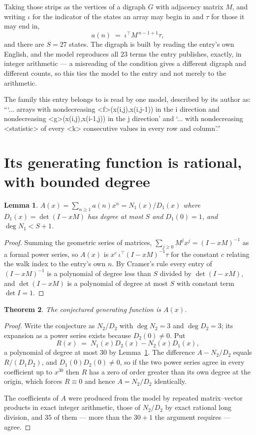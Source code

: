 \documentclass[11pt,a4paper]{article}
\theoremstyle{plain}
\newtheorem{theorem}{Theorem}
\newtheorem{lemma}[theorem]{Lemma}
\theoremstyle{definition}
\begin{document}
Taking those strips as the vertices of a digraph $G$ with adjacency matrix $M$, and writing
$\iota$ for the indicator of the states an array may begin in and $\tau$ for those it may end
in,
\[
a(n)\;=\;\iota^{\!\top}M^{\,n-1+1}\tau ,
\]
and there are $S=27$ states. The digraph is built by reading the entry's own English, and the
model reproduces all $23$ terms the entry publishes, exactly, in integer arithmetic --- a
misreading of the condition gives a different digraph and different counts, so this ties the
model to the entry and not merely to the arithmetic.

The family this entry belongs to is read by one model, described by its author as: ```... arrays with nondecreasing <f>(x(i,j),x(i,j-1)) in the i direction and nondecreasing <g>(x(i,j),x(i-1,j)) in the j direction' and `... with nondecreasing <statistic> of every <k> consecutive values in every row and column'.''


\section{Its generating function is rational, with bounded degree}

\begin{lemma}\label{lem:rat}
$A(x)=\sum_{n\ge1}a(n)x^n=N_1(x)/D_1(x)$ where $D_1(x)=\det(I-xM)$ has degree at most
$S$ and $D_1(0)=1$, and $\deg N_1<S+1$.
\end{lemma}

\begin{proof}
Summing the geometric series of matrices, $\sum_{j\ge0}M^jx^j=(I-xM)^{-1}$ as a formal
power series, so $A(x)$ is $x^{c}\,\iota^{\!\top}(I-xM)^{-1}\tau$ for the constant $c$
relating the walk index to the entry's own $n$. By Cramer's rule every entry of
$(I-xM)^{-1}$ is a polynomial of degree less than $S$ divided by $\det(I-xM)$, and
$\det(I-xM)$ is a polynomial of degree at most $S$ with constant term $\det I=1$.
\end{proof}

\begin{theorem}
The conjectured generating function is $A(x)$.
\end{theorem}

\begin{proof}
Write the conjecture as $N_2/D_2$ with $\deg N_2=3$ and $\deg D_2=3$; its expansion as a
power series exists because $D_2(0)\neq0$. Put
\[
R(x)\;=\;N_1(x)D_2(x)-N_2(x)D_1(x),
\]
a polynomial of degree at most $30$ by Lemma~\ref{lem:rat}. The difference
$A-N_2/D_2$ equals $R/(D_1D_2)$, and $D_1(0)D_2(0)\neq0$, so if the two power series agree in
every coefficient up to $x^{30}$ then $R$ has a zero of order greater than its own
degree at the origin, which forces $R\equiv0$ and hence $A=N_2/D_2$ identically.

The coefficients of $A$ were produced from the model by repeated matrix--vector products in
exact integer arithmetic, those of $N_2/D_2$ by exact rational long division, and $35$
of them --- more than the $30+1$ the argument requires --- agree.
\end{proof}
\end{document}
